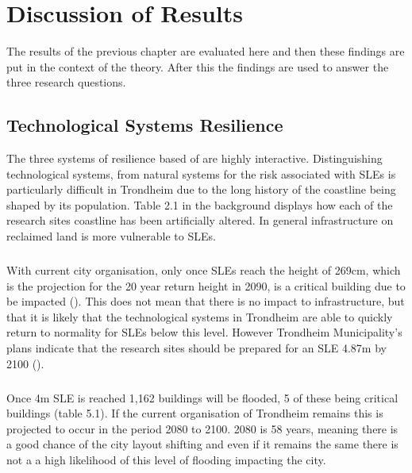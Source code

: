 

\chapter{Discussion of Results}
The results of the previous chapter are evaluated here and then these findings are put in the context of the theory. After this the findings are used to answer the three research questions. 



\section{Technological Systems Resilience}
The three systems of resilience based of \cite{cutter_place-based_2008} are highly interactive. Distinguishing technological systems, from natural systems for the risk associated with SLEs is particularly difficult in Trondheim due to the long history of the coastline being shaped by its population. Table 2.1 in the background  displays how each of the research sites coastline has been artificially altered. In general infrastructure on reclaimed land is more vulnerable to SLEs.
\paragraph{}

With current city organisation, only once SLEs reach the height of 269cm, which is the projection for the 20 year return height in 2090, is a critical building due to be impacted (\cite{kartverket_se_2020}). This does not mean that there is no impact to infrastructure, but that it is likely that the technological systems in Trondheim are able to quickly return to normality for SLEs below this level. However Trondheim Municipality's plans indicate that the research sites should be prepared for an SLE 4.87m by 2100 (\cite{hanssen_saksframlegg_2013}).
\paragraph{}
Once 4m SLE is reached 1,162 buildings will be flooded, 5 of these being critical buildings (table 5.1). If the current organisation of Trondheim remains this is projected to occur in the period 2080 to 2100. 2080 is 58 years, meaning there is a good chance of the city layout shifting and even if it remains the same there is not a a high likelihood of this level of flooding impacting the city.  
